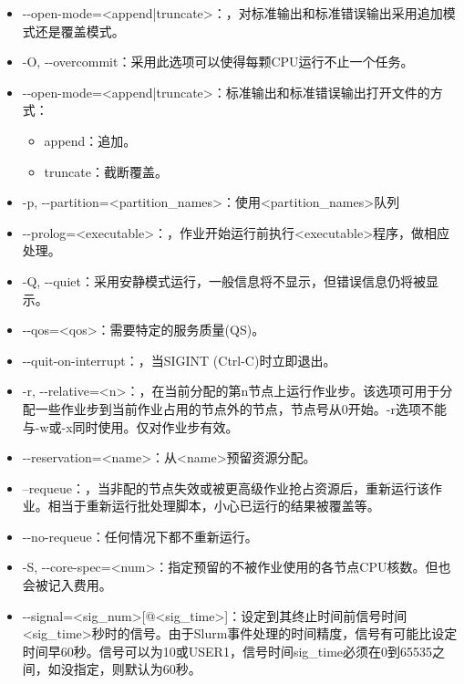 \begin{itemize}
	\item -{}-open-mode=<append|truncate>：，对标准输出和标准错误输出采用追加模式还是覆盖模式。
    \item -O, -{}-overcommit：采用此选项可以使得每颗CPU运行不止一个任务。
	\item -{}-open-mode=<append|truncate>：标准输出和标准错误输出打开文件的方式：
	\begin{itemize}
		\item append：追加。
		\item truncate：截断覆盖。
	\end{itemize}
	\item -p, -{}-partition=<partition\_names>：使用<partition\_names>队列
	\item -{}-prolog=<executable>：，作业开始运行前执行<executable>程序，做相应处理。
    \item -Q, -{}-quiet：采用安静模式运行，一般信息将不显示，但错误信息仍将被显示。
 	\item -{}-qos=<qos>：需要特定的服务质量(QS)。
	\item -{}-quit-on-interrupt：，当SIGINT (Ctrl-C)时立即退出。
	\item -r, -{}-relative=<n>：，在当前分配的第n节点上运行作业步。该选项可用于分配一些作业步到当前作业占用的节点外的节点，节点号从0开始。-r选项不能与-w或-x同时使用。仅对作业步有效。
	\item -{}-reservation=<name>：从<name>预留资源分配。
	\item --requeue：，当非配的节点失效或被更高级作业抢占资源后，重新运行该作业。相当于重新运行批处理脚本，小心已运行的结果被覆盖等。
	\item -{}-no-requeue：任何情况下都不重新运行。
    \item -S, -{}-core-spec=<num>：指定预留的不被作业使用的各节点CPU核数。但也会被记入费用。
    \item -{}-signal=<sig\_num>[@<sig\_time>]：设定到其终止时间前信号时间<sig\_time>秒时的信号。由于Slurm事件处理的时间精度，信号有可能比设定时间早60秒。信号可以为10或USER1，信号时间sig\_time必须在0到65535之间，如没指定，则默认为60秒。

\end{itemize}
